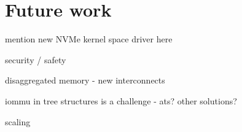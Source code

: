 
\section{Future work}\label{sec:fw}

mention new NVMe kernel space driver here

security / safety

disaggregated memory - new interconnects

iommu in tree structures is a challenge - ats? other solutions?


scaling 



%
%
